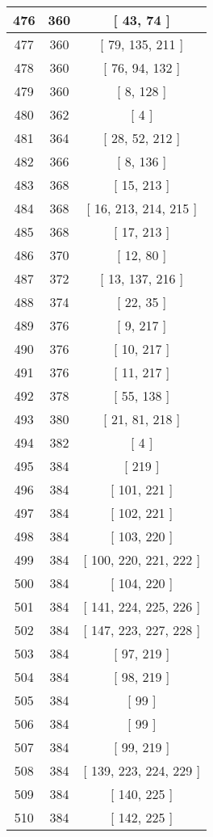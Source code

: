 \begin{center}
\begin{longtable}[H]{|| c c c ||}
476 & 360 & [ 43, 74 ]
\\\hline
477 & 360 & [ 79, 135, 211 ]
\\\hline
478 & 360 & [ 76, 94, 132 ]
\\\hline
479 & 360 & [ 8, 128 ]
\\\hline
480 & 362 & [ 4 ]
\\\hline
481 & 364 & [ 28, 52, 212 ]
\\\hline
482 & 366 & [ 8, 136 ]
\\\hline
483 & 368 & [ 15, 213 ]
\\\hline
484 & 368 & [ 16, 213, 214, 215 ]
\\\hline
485 & 368 & [ 17, 213 ]
\\\hline
486 & 370 & [ 12, 80 ]
\\\hline
487 & 372 & [ 13, 137, 216 ]
\\\hline
488 & 374 & [ 22, 35 ]
\\\hline
489 & 376 & [ 9, 217 ]
\\\hline
490 & 376 & [ 10, 217 ]
\\\hline
491 & 376 & [ 11, 217 ]
\\\hline
492 & 378 & [ 55, 138 ]
\\\hline
493 & 380 & [ 21, 81, 218 ]
\\\hline
494 & 382 & [ 4 ]
\\\hline
495 & 384 & [ 219 ]
\\\hline
496 & 384 & [ 101, 221 ]
\\\hline
497 & 384 & [ 102, 221 ]
\\\hline
498 & 384 & [ 103, 220 ]
\\\hline
499 & 384 & [ 100, 220, 221, 222 ]
\\\hline
500 & 384 & [ 104, 220 ]
\\\hline
501 & 384 & [ 141, 224, 225, 226 ]
\\\hline
502 & 384 & [ 147, 223, 227, 228 ]
\\\hline
503 & 384 & [ 97, 219 ]
\\\hline
504 & 384 & [ 98, 219 ]
\\\hline
505 & 384 & [ 99 ]
\\\hline
506 & 384 & [ 99 ]
\\\hline
507 & 384 & [ 99, 219 ]
\\\hline
508 & 384 & [ 139, 223, 224, 229 ]
\\\hline
509 & 384 & [ 140, 225 ]
\\\hline
510 & 384 & [ 142, 225 ]
\\\hline

\end{longtable}
\end{center}
